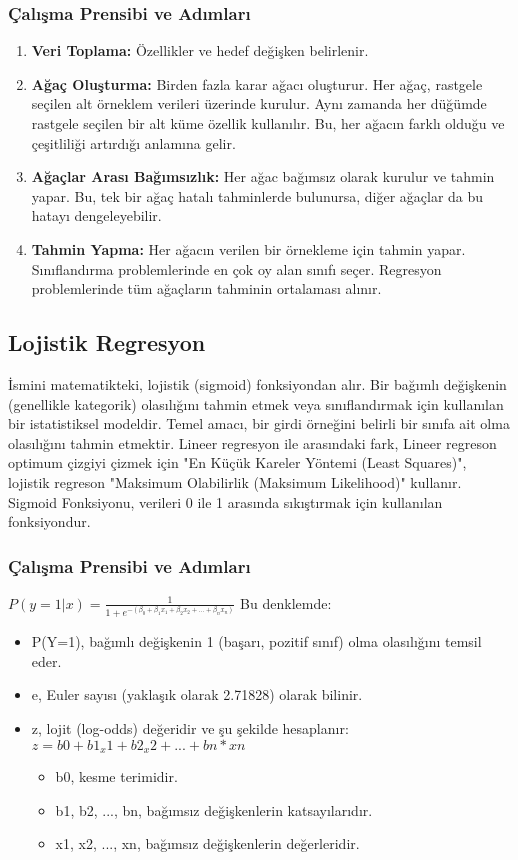 \subsubsection{Çalışma Prensibi ve Adımları}
\begin{enumerate}
\item \textbf{Veri Toplama:} Özellikler ve hedef değişken belirlenir.
\item \textbf{Ağaç Oluşturma:} Birden fazla karar ağacı oluşturur. Her ağaç, rastgele seçilen alt örneklem verileri üzerinde kurulur. Aynı zamanda her düğümde rastgele seçilen bir alt küme özellik kullanılır. Bu, her ağacın farklı olduğu ve çeşitliliği artırdığı anlamına gelir.
\item \textbf{Ağaçlar Arası Bağımsızlık:} Her ağac bağımsız olarak kurulur ve tahmin yapar. Bu, tek bir ağaç hatalı tahminlerde bulunursa, diğer ağaçlar da bu hatayı dengeleyebilir.
\item \textbf{Tahmin Yapma:} Her ağacın verilen bir örnekleme için tahmin yapar. Sınıflandırma problemlerinde en çok oy alan sınıfı seçer. Regresyon problemlerinde tüm ağaçların tahminin ortalaması alınır.
\end{enumerate}

\subsection{Lojistik Regresyon}
İsmini matematikteki, lojistik (sigmoid) fonksiyondan alır. Bir bağımlı değişkenin (genellikle kategorik) olasılığını tahmin etmek veya sınıflandırmak için kullanılan bir istatistiksel modeldir. Temel amacı, bir girdi örneğini belirli bir sınıfa ait olma olasılığını tahmin etmektir. Lineer regresyon ile arasındaki fark, Lineer regreson optimum çizgiyi çizmek için "En Küçük Kareler Yöntemi (Least Squares)", lojistik regreson "Maksimum Olabilirlik (Maksimum Likelihood)" kullanır. Sigmoid Fonksiyonu, verileri 0 ile 1 arasında sıkıştırmak için kullanılan fonksiyondur.

\subsubsection{Çalışma Prensibi ve Adımları}
$P(y=1|x) = \frac{1}{1 + e^{-(\beta_0 + \beta_1 x_1 + \beta_2 x_2 + \dots + \beta_n x_n)}}$
Bu denklemde:
\begin{itemize}
   \item P(Y=1), bağımlı değişkenin 1 (başarı, pozitif sınıf) olma olasılığını temsil eder.
   \item e, Euler sayısı (yaklaşık olarak 2.71828) olarak bilinir.
   \item z, lojit (log-odds) değeridir ve şu şekilde hesaplanır: $z = b0 + b1_x1 + b2_x2 + ... + bn*xn$
   \begin{itemize}
      \item b0, kesme terimidir.
      \item b1, b2, ..., bn, bağımsız değişkenlerin katsayılarıdır.
      \item x1, x2, ..., xn, bağımsız değişkenlerin değerleridir.
   \end{itemize}
\end{itemize}


